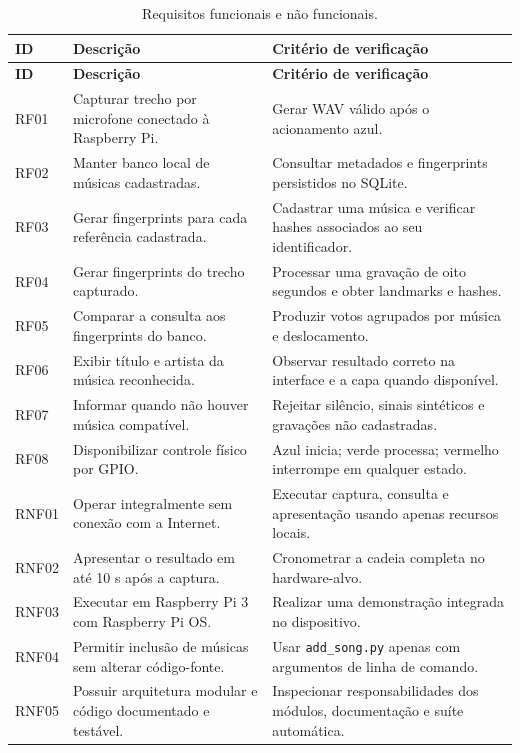\documentclass[12pt,a4paper]{article}
\newcommand{\codigo}[1]{\texttt{#1}}
\begin{document}
\begin{longtable}{C{1.25cm} p{6.1cm} p{6.1cm}}
    \caption{Requisitos funcionais e não funcionais.}\label{tab:requisitos}\\
    \toprule
    \textbf{ID} & \textbf{Descrição} & \textbf{Critério de verificação}\\
    \midrule
    \endfirsthead
    \toprule
    \textbf{ID} & \textbf{Descrição} & \textbf{Critério de verificação}\\
    \midrule
    \endhead
    \bottomrule
    \endfoot
    RF01 & Capturar trecho por microfone conectado à Raspberry Pi. &
    Gerar WAV válido após o acionamento azul.\\
    RF02 & Manter banco local de músicas cadastradas. &
    Consultar metadados e fingerprints persistidos no SQLite.\\
    RF03 & Gerar fingerprints para cada referência cadastrada. &
    Cadastrar uma música e verificar hashes associados ao seu identificador.\\
    RF04 & Gerar fingerprints do trecho capturado. &
    Processar uma gravação de oito segundos e obter landmarks e hashes.\\
    RF05 & Comparar a consulta aos fingerprints do banco. &
    Produzir votos agrupados por música e deslocamento.\\
    RF06 & Exibir título e artista da música reconhecida. &
    Observar resultado correto na interface e a capa quando disponível.\\
    RF07 & Informar quando não houver música compatível. &
    Rejeitar silêncio, sinais sintéticos e gravações não cadastradas.\\
    RF08 & Disponibilizar controle físico por GPIO. &
    Azul inicia; verde processa; vermelho interrompe em qualquer estado.\\
    RNF01 & Operar integralmente sem conexão com a Internet. &
    Executar captura, consulta e apresentação usando apenas recursos locais.\\
    RNF02 & Apresentar o resultado em até 10 s após a captura. &
    Cronometrar a cadeia completa no hardware-alvo.\\
    RNF03 & Executar em Raspberry Pi 3 com Raspberry Pi OS. &
    Realizar uma demonstração integrada no dispositivo.\\
    RNF04 & Permitir inclusão de músicas sem alterar código-fonte. &
    Usar \codigo{add\_song.py} apenas com argumentos de linha de comando.\\
    RNF05 & Possuir arquitetura modular e código documentado e testável. &
    Inspecionar responsabilidades dos módulos, documentação e suíte automática.\\
\end{longtable}
\end{document}
